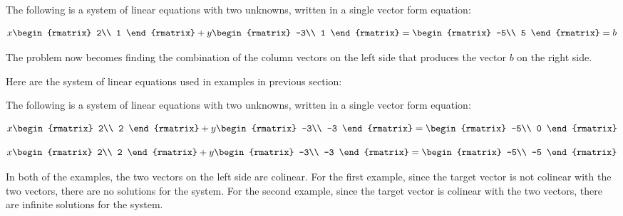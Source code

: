 \documentclass[a4paper,12pt]{article}
\begin{document}
\begin{exm}
  The following is a system of linear equations with two unknowns, written in a single vector form equation:

  $$x\begin{rmatrix}
    2\\
    1
  \end{rmatrix}+y\begin{rmatrix}
    -3\\
    1
  \end{rmatrix}=\begin{rmatrix}
    -5\\
    5
  \end{rmatrix}=b$$\s

  The problem now becomes finding the combination of the column vectors on the left side that produces the vector $b$ on the right side.
\end{exm}\n

Here are the system of linear equations used in examples in previous section:\n

\begin{exm}
  The following is a system of linear equations with two unknowns, written in a single vector form equation:

  $$x\begin{rmatrix}
    2\\
    2
  \end{rmatrix}+y\begin{rmatrix}
    -3\\
    -3
  \end{rmatrix}=\begin{rmatrix}
    -5\\
    0
  \end{rmatrix}$$\s

  $$x\begin{rmatrix}
    2\\
    2
  \end{rmatrix}+y\begin{rmatrix}
    -3\\
    -3
  \end{rmatrix}=\begin{rmatrix}
    -5\\
    -5
  \end{rmatrix}$$\s

  In both of the examples, the two vectors on the left side are colinear. For the first example, since the target vector is not colinear with the two vectors, there are no solutions for the system. For the second example, since the target vector is colinear with the two vectors, there are infinite solutions for the system.
\end{exm}\n
\end{document}
